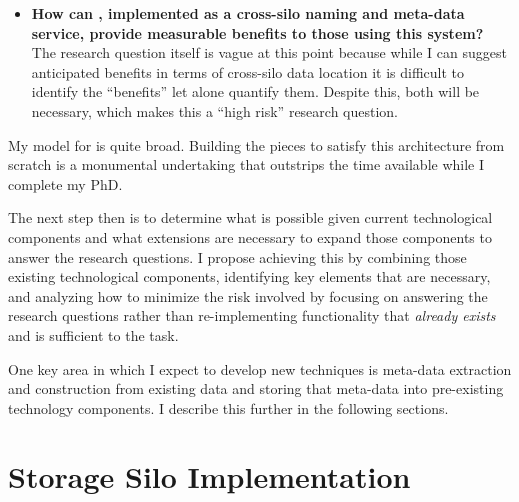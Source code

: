 \begin{itemize}
    \item \textbf{How can \system, implemented as a cross-silo naming and meta-data service,
              provide measurable benefits to those using this system?}
          \label{ch:plan:rq:cross-silo-naming-benefits} The research
          question itself is vague at this point because while I can suggest
          anticipated benefits in terms of cross-silo data location it is difficult to
          identify the ``benefits'' let alone quantify them.  Despite this, both will
          be necessary, which makes this a ``high risk'' research question. 

\end{itemize}

My model for \system is quite broad.  Building the pieces
to satisfy this architecture from scratch is a monumental undertaking that
outstrips the time available while I complete my PhD.

The next step then is to determine what is possible given current technological
components and what extensions are necessary to expand those components to
answer the research questions. I propose achieving this by combining those
existing technological components, identifying key elements that are necessary,
and analyzing how to minimize the risk involved by focusing on answering the
research questions rather than re-implementing functionality that \emph{already
    exists} and is sufficient to the task.

One key area in which I expect to develop new techniques is meta-data extraction
and construction from existing data and storing that meta-data into pre-existing
technology components.  I describe this further in the following sections.

\section{Storage Silo Implementation}
\label{ch:plan:sec:storage-silo-implementation}

